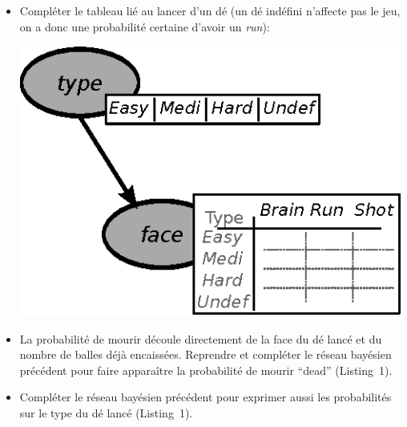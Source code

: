 \documentclass[a4paper, 10pt]{article}
\begin{document}
\begin{itemize}[$\bigcirc$]
  \item

  \begin{minipage}{0.4\textwidth}

  Compléter le tableau lié au lancer d'un dé (un dé indéfini n'affecte pas le jeu, on a donc une probabilité certaine d'avoir un \emph{run}):

  \end{minipage}
  \begin{minipage}{0.02\textwidth}

  \end{minipage}
  \begin{minipage}{0.5\textwidth}

     \centering

	  \includegraphics[width=0.99\textwidth]{fig/resbay_ZD1}

  \end{minipage}

  \item La probabilité de mourir découle directement de la face du dé lancé et du nombre de balles déjà encaissées.
  Reprendre et compléter le réseau bayésien précédent pour faire apparaître la probabilité de mourir ``dead'' (Listing~1).

  \item Compléter le réseau bayésien précédent pour exprimer aussi les probabilités sur le type du dé lancé  (Listing~1).

\begin{lstlisting}[caption={Reseau bayésien mourir avec un dé}]


























\end{lstlisting}
\end{itemize}
\end{document}
